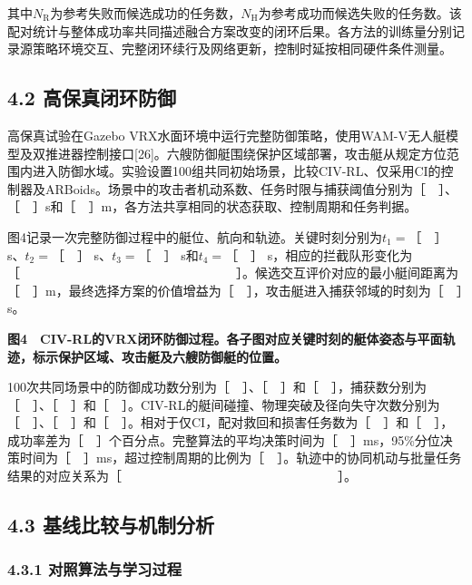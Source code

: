 \documentclass[
  11pt,
  fontset=none]{ctexart}
\newcommand{\blankresultfigure}{\par\Needspace{58mm}\begin{center}\setlength{\fboxsep}{0pt}\fbox{\rule{0pt}{32mm}\rule{.96\linewidth}{0pt}}\end{center}\par\nopagebreak[4]}
\begin{document}
其中\(N_{\mathrm R}\)为参考失败而候选成功的任务数，\(N_{\mathrm H}\)为参考成功而候选失败的任务数。该配对统计与整体成功率共同描述融合方案改变的闭环后果。各方法的训练量分别记录源策略环境交互、完整闭环续行及网络更新，控制时延按相同硬件条件测量。

\subsection{4.2
高保真闭环防御}\label{ux9ad8ux4fddux771fux95edux73afux9632ux5fa1}

高保真试验在Gazebo
VRX水面环境中运行完整防御策略，使用WAM-V无人艇模型及双推进器控制接口{[}26{]}。六艘防御艇围绕保护区域部署，攻击艇从规定方位范围内进入防御水域。实验设置100组共同初始场景，比较CIV-RL、仅采用CI的控制器及ARBoids。场景中的攻击者机动系数、任务时限与捕获阈值分别为［　］、［　］s和［　］m，各方法共享相同的状态获取、控制周期和任务判据。

图4记录一次完整防御过程中的艇位、航向和轨迹。关键时刻分别为\(t_1=\text{［　］}\)
s、\(t_2=\text{［　］}\) s、\(t_3=\text{［　］}\)
s和\(t_4=\text{［　］}\)
s，相应的拦截队形变化为［　　　　　　　　　　　　　　　　　］。候选交互评价对应的最小艇间距离为［　］m，最终选择方案的价值增益为［　］，攻击艇进入捕获邻域的时刻为［　］s。

\blankresultfigure

\textbf{图4　CIV-RL的VRX闭环防御过程。各子图对应关键时刻的艇体姿态与平面轨迹，标示保护区域、攻击艇及六艘防御艇的位置。}

100次共同场景中的防御成功数分别为［　］、［　］和［　］，捕获数分别为［　］、［　］和［　］。CIV-RL的艇间碰撞、物理突破及径向失守次数分别为［　］、［　］和［　］。相对于仅CI，配对救回和损害任务数为［　］和［　］，成功率差为［　］个百分点。完整算法的平均决策时间为［　］ms，95\%分位决策时间为［　］ms，超过控制周期的比例为［　］。轨迹中的协同机动与批量任务结果的对应关系为［　　　　　　　　　　　　　　　　　］。

\subsection{4.3
基线比较与机制分析}\label{ux57faux7ebfux6bd4ux8f83ux4e0eux673aux5236ux5206ux6790}

\subsubsection{4.3.1
对照算法与学习过程}\label{ux5bf9ux7167ux7b97ux6cd5ux4e0eux5b66ux4e60ux8fc7ux7a0b}
\end{document}
